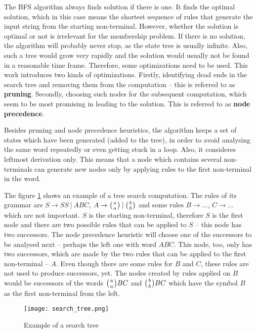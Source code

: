 The BFS algorithm always finds solution if there is one. It finds the optimal solution, which in this case means the shortest sequence of rules that generate the input string from the starting non-terminal. However, whether the solution is optimal or not is irrelevant for the membership problem. If there is no solution, the algorithm will probably never stop, as the state tree is usually infinite. Also, such a tree would grow very rapidly and the solution would usually not be found in a reasonable time frame. Therefore, some optimizations need to be used. This work introduces two kinds of optimizations. Firstly, identifying dead ends in the search tree and removing them from the computation -- this is referred to as \textbf{pruning}. Secondly, choosing such nodes for the subsequent computation, which seem to be most promising in leading to the solution. This is referred to as \textbf{node precedence}.

Besides pruning and node precedence heuristics, the algorithm keeps a set of states which have been generated (added to the tree), in order to avoid analysing the same word repeatedly or even getting stuck in a loop. Also, it consideres leftmost derivation only. This means that a node which contains several non-terminals can generate new nodes only by applying rules to the first non-terminal in the word.

The figure \ref{fig:search_tree} shows an example of a tree search computation. The rules of its grammar are $S \rightarrow S S \:|\: A B C$, $A \rightarrow \wkpair{a}{a} \:|\: \wkpair{b}{b}$ and some rules $B \rightarrow ...$, $C \rightarrow ...$ which are not important. $S$ is the starting non-terminal, therefore $S$ is the first node and there are two possible rules that can be applied to $S$ -- this node has two successors. The node precedence heuristic will choose one of the successors to be analysed next -- perhaps the left one with word $A B C$. This node, too, only has two successors, which are made by the two rules that can be applied to the first non-terminal -- $A$. Even though there are some rules for $B$ and $C$, these rules are not used to produce successors, yet. The nodes created by rules applied on $B$ would be successors of the words $\wkpair{a}{a} B C$ and $\wkpair{b}{b} B C$ which have the symbol $B$ as the first non-terminal from the left.

\begin{figure}[h]
  \centering
  \texttt{[image: search\_tree.png]}
  \caption{Example of a search tree}
  \label{fig:search_tree}
\end{figure}


